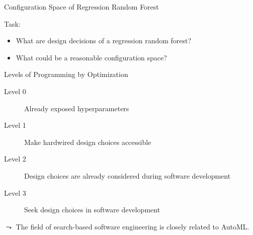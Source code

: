 \begin{frame}{Configuration Space of Regression Random Forest}

Task: \hands
\begin{itemize}
  \item What are design decisions of a regression random forest?
  \item What could be a reasonable configuration space?  
\end{itemize}



\end{frame}
\begin{frame}[c]{Levels of Programming by Optimization }

\begin{description}
\item[Level 0] Already exposed hyperparameters
\pause
\item[Level 1] Make hardwired design choices accessible
\pause
\item[Level 2] Design choices are already considered during software development
\pause 
\item[Level 3] Seek design choices in software development
\end{description}

\pause

$\leadsto$ The field of search-based software engineering is closely related to AutoML.

\end{frame}
